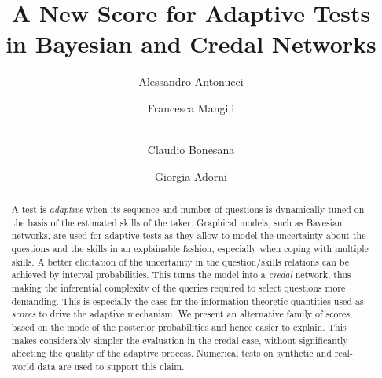 \documentclass[runningheads]{llncs}
\begin{document}
\title{A New Score for Adaptive Tests\\in Bayesian and Credal Networks}
\author{Alessandro Antonucci \and
Francesca Mangili \and\\
Claudio Bonesana \and
Giorgia Adorni}
\maketitle
\begin{abstract}
A test is \emph{adaptive} when its sequence and number of questions is dynamically tuned on the basis of the estimated skills of the taker. Graphical models, such as Bayesian networks, are used for adaptive tests as they allow to model the uncertainty about the questions and the skills in an explainable fashion, especially when coping with multiple skills. A better elicitation of the uncertainty in the question/skills relations can be achieved by interval probabilities. This turns the model into a \emph{credal} network, thus making the inferential complexity of the queries required to select questions more demanding. This is especially the case for the information theoretic quantities used as \emph{scores} to drive the adaptive mechanism. We present an alternative family of scores, based on the mode of the posterior probabilities and hence easier to explain. This makes considerably simpler the evaluation in the credal case, without significantly affecting the quality of the adaptive process. Numerical tests on synthetic and real-world data are used to support this claim.
\end{abstract}
\end{document}
